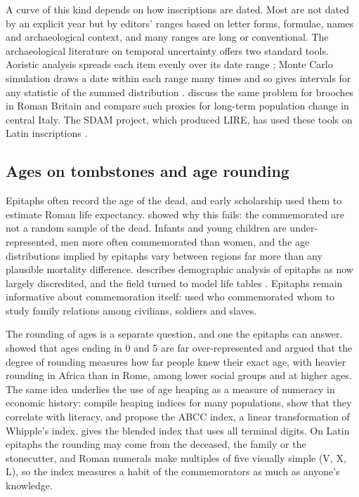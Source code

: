 \documentclass[11pt,a4paper]{article}
\begin{document}
A curve of this kind depends on how inscriptions are dated. Most are not dated by an explicit year but by editors' ranges based on letter forms, formulae, names and archaeological context, and many ranges are long or conventional. The archaeological literature on temporal uncertainty offers two standard tools. Aoristic analysis spreads each item evenly over its date range \citep{ratcliffe2000,johnson2004}; Monte Carlo simulation draws a date within each range many times and so gives intervals for any statistic of the summed distribution \citep{crema2012}. \citet{baxtercool2016} discuss the same problem for brooches in Roman Britain and \citet{palmisano2017} compare such proxies for long-term population change in central Italy. The SDAM project, which produced LIRE, has used these tools on Latin inscriptions \citep{hermankova2021,kase2022division}.

\subsection{Ages on tombstones and age rounding}
Epitaphs often record the age of the dead, and early scholarship used them to estimate Roman life expectancy. \citet{hopkins1966} showed why this fails: the commemorated are not a random sample of the dead. Infants and young children are under-represented, men more often commemorated than women, and the age distributions implied by epitaphs vary between regions far more than any plausible mortality difference. \citet{scheidel2001} describes demographic analysis of epitaphs as now largely discredited, and the field turned to model life tables \citep{frier1982,frier1983,parkin1992,scheidel1996}. Epitaphs remain informative about commemoration itself: \citet{sallershaw1984} used who commemorated whom to study family relations among civilians, soldiers and slaves.

The rounding of ages is a separate question, and one the epitaphs can answer. \citet{duncanjones1977} showed that ages ending in 0 and 5 are far over-represented and argued that the degree of rounding measures how far people knew their exact age, with heavier rounding in Africa than in Rome, among lower social groups and at higher ages. The same idea underlies the use of age heaping as a measure of numeracy in economic history: \citet{ahearn2009} compile heaping indices for many populations, show that they correlate with literacy, and propose the ABCC index, a linear transformation of Whipple's index. \citet{myers1940} gives the blended index that uses all terminal digits. On Latin epitaphs the rounding may come from the deceased, the family or the stonecutter, and Roman numerals make multiples of five visually simple (V, X, L), so the index measures a habit of the commemorators as much as anyone's knowledge.
\end{document}
